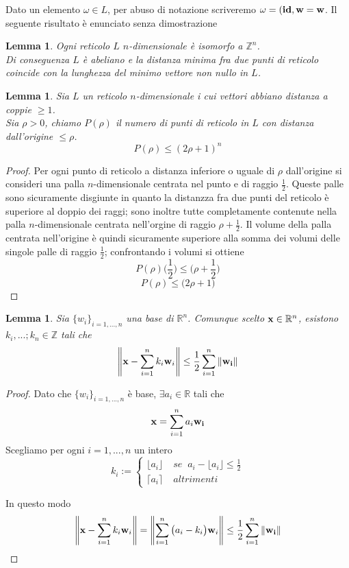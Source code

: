 \documentclass[a4paper]{book}
\newtheorem{lemma}[theorem]{Lemma}
\begin{document}
Dato un elemento $\omega \in L$, per abuso di notazione scriveremo $\omega = (\vb{id, w} = \vb{w}$. 
Il seguente risultato è enunciato senza dimostrazione 
\begin{lemma}
Ogni reticolo $L$ $n$-dimensionale è isomorfo a $\mathbb{Z}^n$. \\
Di conseguenza $L$ è abeliano e la distanza minima fra due punti di reticolo coincide con la lunghezza del minimo vettore non nullo in $L$.  
\end{lemma}

\begin{lemma}
\label{lemma:rho}
Sia $L$ un reticolo $n$-dimensionale i cui vettori abbiano distanza a coppie $\geq 1$. \\
Sia $\rho >0$, chiamo $P(\rho)$ il numero di punti di reticolo in $L$ con distanza dall'origine $\leq \rho$. 
\[ P(\rho) \leq (2 \rho +1)^n\]
\end{lemma}
\begin{proof}
Per ogni punto di reticolo a distanza inferiore o uguale di $\rho$ dall'origine si consideri una palla $n$-dimensionale centrata nel punto e di raggio $\frac{1}{2}$. Queste palle sono sicuramente disgiunte in quanto la distanzza fra due punti del reticolo è superiore al doppio dei raggi; sono inoltre tutte completamente contenute nella palla $n$-dimensionale centrata nell'orgine di raggio $ \rho + \frac{1}{2}$. 
Il volume della palla centrata nell'origine è quindi sicuramente superiore alla somma dei volumi delle singole palle di raggio $\frac{1}{2}$; confrontando i volumi si ottiene
\[ P(\rho) \bigg(  \frac{1}{2} \bigg) \leq \bigg( \rho + \frac{1}{2} \bigg) \]
\[ P(\rho) \leq \bigg( 2 \rho + 1 \bigg)\]
\end{proof}

\begin{lemma}
\label{lemma:somma}
Sia $\{w_i \}_{i=1,...,n}$ una base di $\mathbb{R}^n$. Comunque scelto $\vb{x} \in \mathbb{R}^n$, esistono $k_i, ...; k_n \in \mathbb{Z}$ tali che 
\[ \norm{\vb{x} - \sum_{i=1}^{n} k_i \vb{w}_i} \leq \frac{1}{2} \sum_{i=1}^{n} \norm{\vb{w_i}} \] 
\end{lemma}

\begin{proof}
Dato che $\{w_i \}_{i=1,...,n}$ è base, $\exists a_i \in \mathbb{R}$ tali che 
\[\vb{x} = \sum_{i=1}^{n} a_i \vb{w_i} \]
Scegliamo per ogni $i= 1,...,n$ un intero 
\[ k_i := \begin{cases} 
\lfloor a_i \rfloor \;  & se \; \; a_i - \lfloor a_i \rfloor \leq \frac{1}{2} \\
\lceil a_i \rceil \; & altrimenti
\end{cases}\]

In questo modo 
\[ \norm{\vb{x} - \sum_{i=1}^{n} k_i \vb{w}_i} = \norm{\sum_{i=1}^{n} \big(a_i - k_i \big)\vb{w}_i} \leq  \frac{1}{2} \sum_{i=1}^{n} \norm{\vb{w_i}}  \]
\end{proof}
\end{document}
